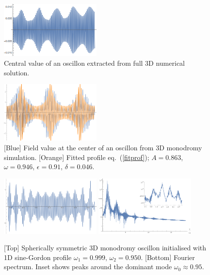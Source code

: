 \documentclass[%
reprint,
superscriptaddress,
amsmath,amssymb,
aps,
prl,
floatfix,
nofootinbib
]{revtex4-1}
\begin{document}
\begin{figure}
  \centering
  \includegraphics[width=0.45\textwidth]{plot/3Doscillon.png} 
    \caption{Central value of an oscillon extracted from full 3D numerical solution.}
  \label{raw}
\end{figure}

\begin{figure}
  \centering
  \includegraphics[width=0.45\textwidth]{plot/simul-profile.png}
  \caption{[Blue] Field value at the center of an oscillon from 3D monodromy simulation. [Orange] Fitted profile eq.~(\ref{fitprof}); $A=0.863$, $\omega=0.946$, $\epsilon=0.91$,  $\delta=0.046$.}\label{simul-prof}
\end{figure}

\begin{figure}
  \centering
  \includegraphics[width=0.45\textwidth]{plot/profile-3scale.png}
  \includegraphics[width=0.45\textwidth]{plot/fourier.png}
  \caption{[Top] Spherically symmetric 3D monodromy oscillon initialised with 1D
    sine-Gordon profile $\omega_1=0.999$, $\omega_2=0.950$.  [Bottom] Fourier spectrum. Inset shows  peaks around the dominant mode $\omega_0\approx0.95$.}\label{fourier}
\end{figure}
 
\end{document}
